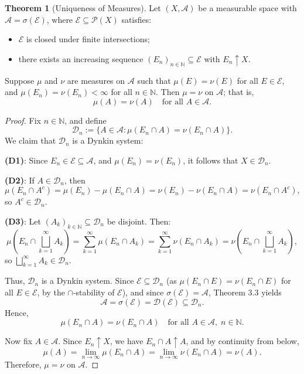 \documentclass[12pt]{article}
\theoremstyle{definition}
\newtheorem{theorem}{Theorem}[section]
\begin{document}
\medskip
\begin{theorem}[Uniqueness of Measures]
Let \( (X, \mathcal{A}) \) be a measurable space with \( \mathcal{A} = \sigma(\mathcal{E}) \), where \( \mathcal{E} \subseteq \mathcal{P}(X) \) satisfies:
\begin{itemize}
  \item \( \mathcal{E} \) is closed under finite intersections;
  \item there exists an increasing sequence \( (E_n)_{n \in \mathbb{N}} \subseteq \mathcal{E} \) with \( E_n \uparrow X \).
\end{itemize}
Suppose \( \mu \) and \( \nu \) are measures on \( \mathcal{A} \) such that \( \mu(E) = \nu(E) \) for all \( E \in \mathcal{E} \), and \( \mu(E_n) = \nu(E_n) < \infty \) for all \( n \in \mathbb{N} \). Then \( \mu = \nu \) on \( \mathcal{A} \); that is,
\[
\mu(A) = \nu(A) \quad \text{for all } A \in \mathcal{A}.
\]
\end{theorem}

\begin{proof}
Fix \( n \in \mathbb{N} \), and define
\[
\mathcal{D}_n := \{ A \in \mathcal{A} : \mu(E_n \cap A) = \nu(E_n \cap A) \}.
\]
We claim that \( \mathcal{D}_n \) is a Dynkin system:

\medskip
\textbf{(D1)}: Since \( E_n \in \mathcal{E} \subseteq \mathcal{A} \), and \( \mu(E_n) = \nu(E_n) \), it follows that \( X \in \mathcal{D}_n \).

\medskip
\textbf{(D2)}: If \( A \in \mathcal{D}_n \), then
\[
\mu(E_n \cap A^c) = \mu(E_n) - \mu(E_n \cap A) = \nu(E_n) - \nu(E_n \cap A) = \nu(E_n \cap A^c),
\]
so \( A^c \in \mathcal{D}_n \).

\medskip
\textbf{(D3)}: Let \( (A_k)_{k \in \mathbb{N}} \subseteq \mathcal{D}_n \) be disjoint. Then:
\[
\mu\left(E_n \cap \bigsqcup_{k=1}^\infty A_k\right)
= \sum_{k=1}^\infty \mu(E_n \cap A_k)
= \sum_{k=1}^\infty \nu(E_n \cap A_k)
= \nu\left(E_n \cap \bigsqcup_{k=1}^\infty A_k\right),
\]
so \( \bigsqcup_{k=1}^\infty A_k \in \mathcal{D}_n \).

\medskip
Thus, \( \mathcal{D}_n \) is a Dynkin system. Since \( \mathcal{E} \subseteq \mathcal{D}_n \) (as \( \mu(E_n \cap E) = \nu(E_n \cap E) \) for all \( E \in \mathcal{E} \), by the \(\cap\)-stability of \( \mathcal{E} \)), and since \( \sigma(\mathcal{E}) = \mathcal{A} \), Theorem 3.3 yields
\[
\mathcal{A} = \sigma(\mathcal{E}) = \mathcal{D}(\mathcal{E}) \subseteq \mathcal{D}_n.
\]
Hence,
\[
\mu(E_n \cap A) = \nu(E_n \cap A) \quad \text{for all } A \in \mathcal{A},\; n \in \mathbb{N}.
\]

\medskip
Now fix \( A \in \mathcal{A} \). Since \( E_n \uparrow X \), we have \( E_n \cap A \uparrow A \), and by continuity from below,
\[
\mu(A) = \lim_{n \to \infty} \mu(E_n \cap A) = \lim_{n \to \infty} \nu(E_n \cap A) = \nu(A).
\]
Therefore, \( \mu = \nu \) on \( \mathcal{A} \).
\end{proof}
\end{document}
